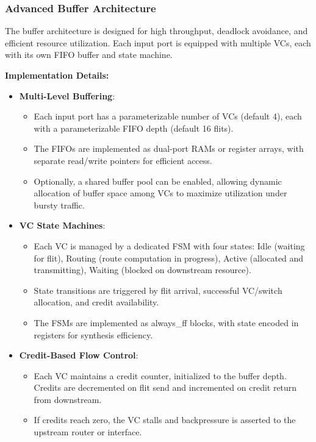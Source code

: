 \documentclass[11pt,a4paper]{article}
\begin{document}
\subsubsection{Advanced Buffer Architecture}

The buffer architecture is designed for high throughput, deadlock avoidance, and efficient resource utilization. Each input port is equipped with multiple VCs, each with its own FIFO buffer and state machine.

\textbf{Implementation Details:}
\begin{itemize}
    \item \textbf{Multi-Level Buffering}:
    \begin{itemize}
        \item Each input port has a parameterizable number of VCs (default 4), each with a parameterizable FIFO depth (default 16 flits).
        \item The FIFOs are implemented as dual-port RAMs or register arrays, with separate read/write pointers for efficient access.
        \item Optionally, a shared buffer pool can be enabled, allowing dynamic allocation of buffer space among VCs to maximize utilization under bursty traffic.
    \end{itemize}
    \item \textbf{VC State Machines}:
    \begin{itemize}
        \item Each VC is managed by a dedicated FSM with four states: Idle (waiting for flit), Routing (route computation in progress), Active (allocated and transmitting), Waiting (blocked on downstream resource).
        \item State transitions are triggered by flit arrival, successful VC/switch allocation, and credit availability.
        \item The FSMs are implemented as always\_ff blocks, with state encoded in registers for synthesis efficiency.
    \end{itemize}
    \item \textbf{Credit-Based Flow Control}:
    \begin{itemize}
        \item Each VC maintains a credit counter, initialized to the buffer depth. Credits are decremented on flit send and incremented on credit return from downstream.
        \item If credits reach zero, the VC stalls and backpressure is asserted to the upstream router or interface.

\end{itemize}
\end{itemize}
\end{document}
